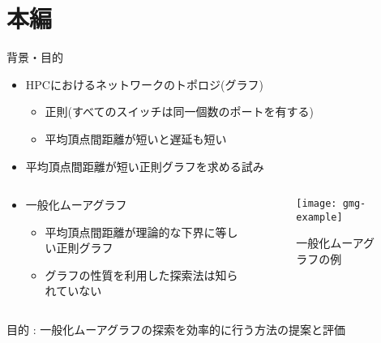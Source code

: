 
\begin{frame}
  \maketitle
\end{frame}

\section{本編}
\begin{frame}{背景・目的}
  \begin{itemize}
  \item HPCにおけるネットワークのトポロジ(グラフ)
    \begin{itemize}
    \item 正則(すべてのスイッチは同一個数のポートを有する)
    \item 平均頂点間距離が短いと遅延も短い
      \cite{Koibuchi2012,Singla2011}
    \end{itemize}
  \item 平均頂点間距離が短い正則グラフを求める試み
    \cite{Fujita2015,Yamamoto2016,Fujiwara2015}
  \end{itemize}
  \begin{columns}[T]
    \begin{column}{.5\textwidth}
      \begin{itemize}
      \item \alert{一般化ムーアグラフ}
        \begin{itemize}
        \item 平均頂点間距離が理論的な下界に等しい正則グラフ
          \cite{Cerf1973,Cerf1974Lower}
        \item グラフの性質を利用した探索法は知られていない
        \end{itemize}
      \end{itemize}
    \end{column}
    \begin{column}{.5\textwidth}
      \begin{figure}
        \texttt{[image: gmg-example]}
        \caption{一般化ムーアグラフの例}
      \end{figure}
    \end{column}
  \end{columns}
  \begin{block}{}
    目的 : 一般化ムーアグラフの探索を効率的に行う方法の提案と評価
  \end{block}
\end{frame}

